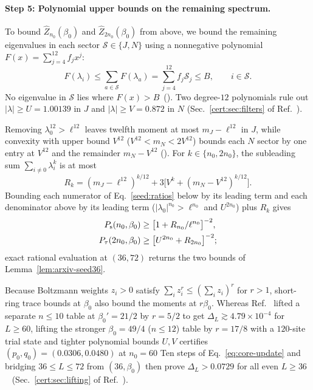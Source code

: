 \paragraph{Step 5: Polynomial upper bounds on the remaining spectrum.}
To bound $\widehat Z_{n_0}(\beta_0)$ and $\widehat Z_{2n_0}(\beta_0)$
from above, we bound the remaining eigenvalues in each sector
$\mathcal S\in\{J,N\}$ using a nonnegative polynomial
$F(x)=\sum_{j=4}^{12}f_jx^j$:
\begin{equation*}
    F(\lambda_i)\le\sum_{a\in\mathcal S}F(\lambda_a)
    =\sum_{j=4}^{12}f_j\mathcal S_j\le B,
    \qquad i\in\mathcal S.
\end{equation*}
No eigenvalue in $\mathcal S$ lies where $F(x)>B$~(\filterglyph).
Two degree-$12$ polynomials rule out $|\lambda|\ge U=1.00139$ in $J$
and $|\lambda|\ge V=0.872$ in $N$ (Sec.~\ref{cert:sec:filters} of
Ref.~\cite{SM}).

Removing $\lambda_0^{12}>\ell^{12}$ leaves twelfth moment at most
$m_J-\ell^{12}$ in $J$, while convexity with upper bound $V^{12}$
($V^{12}<m_N<2V^{12}$) bounds each $N$ sector by one entry at $V^{12}$
and the remainder $m_N-V^{12}$ (). For
$k\in\{n_0,2n_0\}$, the subleading sum $\sum_{i\ne0}\lambda_i^k$ is at
most
\begin{equation*}
    R_k=(m_J-\ell^{12})^{k/12}+3\bigl[V^k+(m_N-V^{12})^{k/12}\bigr].
\end{equation*}
Bounding each numerator of Eq.~\eqref{seed:ratios} below by its leading
term and each denominator above by its leading term
($|\lambda_0|^{n_0}>\ell^{n_0}$ and $U^{2n_0}$) plus $R_k$ gives%
~
\begin{align*}
    P_{\mathrm s}(n_0,\beta_0)  & \ge\bigl[1+R_{n_0}/\ell^{n_0}\bigr]^{-2},\notag \\
    P_{\tau}(2n_0,\beta_0) & \ge\bigl[U^{2n_0}+R_{2n_0}\bigr]^{-2};
\end{align*}
exact rational evaluation at $(36,72)$ returns the two bounds of
Lemma~\ref{lem:arxiv-seed36}.

Because Boltzmann weights $z_i>0$ satisfy
$\sum_i z_i^r\le(\sum_i z_i)^r$ for $r>1$, short-ring trace bounds at
$\beta_0$ also bound the moments at $r\beta_0$. Whereas
Ref.~\cite{OpenAI2026Periodic} lifted a separate $n\le10$ table at
$\beta_0'=21/2$ by $r=5/2$ to get $\Delta_L\gtrsim4.79\times10^{-4}$ for
$L\ge60$, lifting the stronger $\beta_0=49/4$ ($n\le12$) table by
$r=17/8$ with a $120$-site trial state and tighter polynomial bounds
$U,V$ certifies $(p_0,q_0)=(0.0306,0.0480)$ at $n_0=60$%
Ten steps of Eq.~\eqref{eq:core-update} and bridging $36\le L\le72$
from $(36,\beta_0)$ then prove $\Delta_L>0.0729$ for all even
$L\ge36$%
~
(Sec.~\ref{cert:sec:lifting} of Ref.~\cite{SM}).


